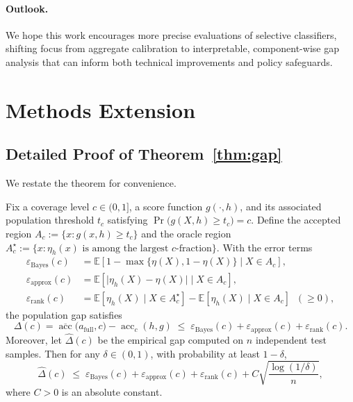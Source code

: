 \paragraph{Outlook.}
We hope this work encourages more precise evaluations of selective classifiers, shifting focus from aggregate calibration to interpretable, component-wise gap analysis that can inform both technical improvements and policy safeguards.


\section{Methods Extension}
\label{sec:meth_ext}

\subsection{Detailed Proof of Theorem~\ref{thm:gap}}
\label{app:proof-gap-ranking}

We restate the theorem for convenience.

\begin{theorem}
Fix a coverage level \(c\in(0,1]\), a score function \(g(\cdot,h)\),
and its associated population threshold
\(t_c\) satisfying \(\Pr\bigl(g(X,h)\ge t_c\bigr)=c\).
Define the accepted region \(A_c:=\{x:g(x,h)\ge t_c\}\) and
the oracle region
\(A_c^{\star}:=\{x:\eta_h(x)\text{ is among the largest }c\text{-fraction}\}\).
With the error terms
\begin{align}
\varepsilon_{\mathrm{Bayes}}(c)
&= \mathbb{E}\left[1 - \max\{\eta(X), 1 - \eta(X)\} \mid X \in A_c \right], \\
\varepsilon_{\mathrm{approx}}(c)
&= \mathbb{E}\left[ \lvert \eta_h(X) - \eta(X) \rvert \mid X \in A_c \right], \\
\varepsilon_{\mathrm{rank}}(c)
&= \mathbb{E}\left[ \eta_h(X) \mid X \in A_c^{\star} \right]
 - \mathbb{E}\left[ \eta_h(X) \mid X \in A_c \right] \;\;(\ge 0),
\end{align}
the population gap satisfies
\begin{equation}
\label{eq:pop-gap-app}
\Delta(c)=\overline{\operatorname{acc}}\bigl(a_{\mathrm{full}},c\bigr)
-\operatorname{acc}_c(h,g)
\;\le\;
\varepsilon_{\mathrm{Bayes}}(c)
+\varepsilon_{\mathrm{approx}}(c)
+\varepsilon_{\mathrm{rank}}(c).
\end{equation}
Moreover, let \(\widehat{\Delta}(c)\) be the empirical gap computed on
\(n\) independent test samples.  Then for any
\(\delta\in(0,1)\), with probability at least \(1-\delta\),
\begin{equation}
\label{eq:emp-gap-app}
\widehat{\Delta}(c)
\;\le\;
\varepsilon_{\mathrm{Bayes}}(c)
+\varepsilon_{\mathrm{approx}}(c)
+\varepsilon_{\mathrm{rank}}(c)
+ C\sqrt{\frac{\log(1/\delta)}{n}},
\end{equation}
where \(C>0\) is an absolute constant.
\end{theorem}

